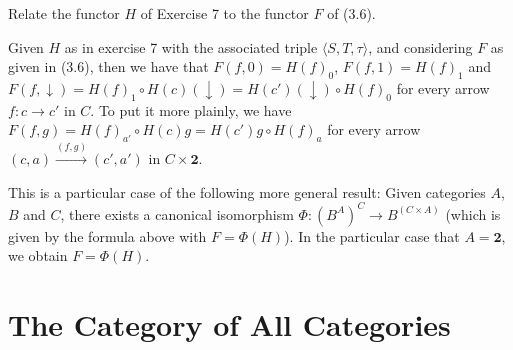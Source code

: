 \begin{exercise}
Relate the functor $H$ of Exercise 7 to the functor $F$ of (3.6).
\end{exercise}
\begin{solution}
Given $H$ as in exercise 7 with the associated triple $\langle S,T,\tau\rangle$, and considering $F$ as given in (3.6), then we have that $F(f,0)=H(f)_0$, $F(f,1)=H(f)_1$ and $F(f,\downarrow)=H(f)_1\circ H(c)(\downarrow)=H(c')(\downarrow)\circ H(f)_0$ for every arrow $f:c\to c'$ in $C$. To put it more plainly, we have $F(f,g)=H(f)_{a'}\circ H(c)g=H(c')g\circ H(f)_a$ for every arrow $(c,a)\overset{(f,g)}{\to}(c',a')$ in $C\times\mathbf{2}$.

This is a particular case of the following more general result: Given categories $A$, $B$ and $C$, there exists a canonical isomorphism $\Phi:(B^A)^C\to B^(C\times A)$ (which is given by the formula above with $F=\Phi(H)$). In the particular case that $A=\mathbf{2}$, we obtain $F=\Phi(H)$.
\end{solution}

\section{The Category of All Categories}

